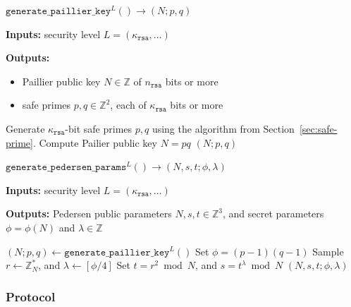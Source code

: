 \documentclass[11pt]{article}
\newenvironment{inlineAlgorithm}{}{}
\newcommand{\algoName}[1]{#1 \par}
\newcommand{\algoInputs}[1]{
    {\small \bf Inputs:} #1 \par
}
\newcommand{\algoOutputs}[1]{
    {\small \bf Outputs:} #1 \par
}
\newcommand{\algoOutputsList}[1]{
    {\small \bf Outputs:}
        \begin{itemize}[noitemsep,topsep=0pt]
            #1
        \end{itemize}
}
\newcommand{\fn}[1]{\ensuremath{\mathtt{#1}}}
\newcommand{\rsa}{\ensuremath{\mathtt{rsa}}}
\newcommand{\Z}{\mathbb{Z}}
\newcommand{\?}[1]{\stackrel{?}{#1}}
\begin{document}
\begin{description}

\item
\begin{inlineAlgorithm}
\algoName{$\fn{generate\_paillier\_key}^L() \to (N; p, q)$}
\algoInputs{security level $L = (\kappa_\rsa, \dots)$}
\algoOutputsList{
    \item Paillier public key $N \in \Z$ of $n_\rsa$ bits or more
    \item safe primes $p, q \in \Z^2$, each of $\kappa_\rsa$ bits or more
}
\begin{algorithmic}[1]
\State Generate $\kappa_\rsa$-bit safe primes $p, q$ using the algorithm from Section~\ref{sec:safe-prime}.
\State Compute Pailier public key $N = pq$
\State \Return $(N; p, q)$
\end{algorithmic}
\end{inlineAlgorithm}

\item
\begin{inlineAlgorithm}
\algoName{$\fn{generate\_pedersen\_params}^L() \to (N, s, t; \phi, \lambda)$}
\algoInputs{security level $L = (\kappa_\rsa, \dots)$}
\algoOutputs{Pedersen public parameters $N, s, t \in \Z^3$, and secret parameters $\phi = \phi(N)$ and $\lambda \in \Z$}
\begin{algorithmic}[1]
\State $(N; p, q) \gets \fn{generate\_paillier\_key}^L()$
\State Set $\phi = (p-1)(q-1)$
\State Sample $r \gets \Z^*_N$, and $\lambda \gets [\phi/4]$
\State Set $t = r^2 \bmod N$, and $s = t^\lambda \bmod N$
\State \Return $(N, s, t; \phi, \lambda)$
\end{algorithmic}
\end{inlineAlgorithm}

\end{description}

\subsubsection{Protocol}
\end{document}
